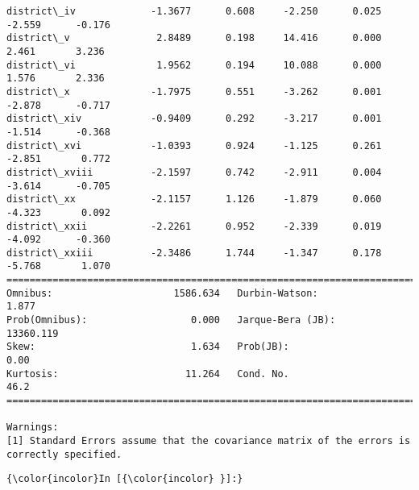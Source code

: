\documentclass[11pt]{article}
\begin{document}
\begin{Verbatim}[commandchars=\\\{\}]
district\_iv             -1.3677      0.608     -2.250      0.025      -2.559      -0.176
district\_v               2.8489      0.198     14.416      0.000       2.461       3.236
district\_vi              1.9562      0.194     10.088      0.000       1.576       2.336
district\_x              -1.7975      0.551     -3.262      0.001      -2.878      -0.717
district\_xiv            -0.9409      0.292     -3.217      0.001      -1.514      -0.368
district\_xvi            -1.0393      0.924     -1.125      0.261      -2.851       0.772
district\_xviii          -2.1597      0.742     -2.911      0.004      -3.614      -0.705
district\_xx             -2.1157      1.126     -1.879      0.060      -4.323       0.092
district\_xxii           -2.2261      0.952     -2.339      0.019      -4.092      -0.360
district\_xxiii          -2.3486      1.744     -1.347      0.178      -5.768       1.070
==============================================================================
Omnibus:                     1586.634   Durbin-Watson:                   1.877
Prob(Omnibus):                  0.000   Jarque-Bera (JB):            13360.119
Skew:                           1.634   Prob(JB):                         0.00
Kurtosis:                      11.264   Cond. No.                         46.2
==============================================================================

Warnings:
[1] Standard Errors assume that the covariance matrix of the errors is correctly specified.

    \end{Verbatim}

    \begin{Verbatim}[commandchars=\\\{\}]
{\color{incolor}In [{\color{incolor} }]:} 
\end{Verbatim}


    
    
    
    
\end{document}
